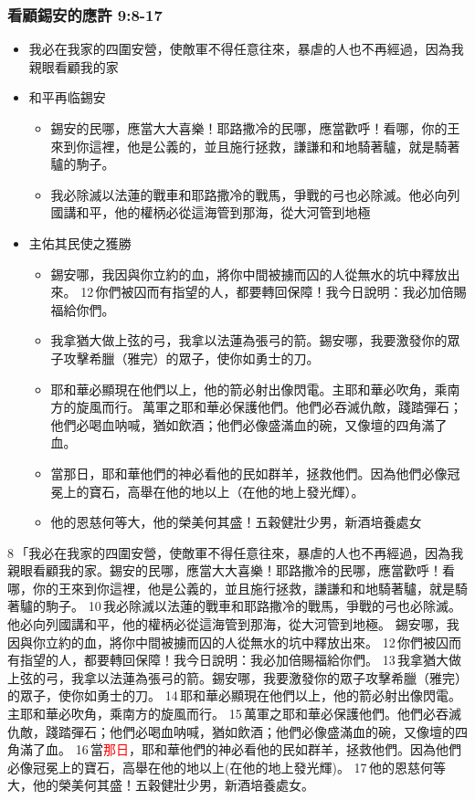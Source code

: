\subsubsection{看顧錫安的應許 9:8-17}
\begin{itemize} 
\itemsep-.5em 
\item 我必在我家的四圍安營，使敵軍不得任意往來，暴虐的人也不再經過，因為我親眼看顧我的家
\item 和平再临錫安
\begin{itemize} 
\itemsep-.5em 
\item 錫安的民哪，應當大大喜樂！耶路撒冷的民哪，應當歡呼！看哪，你的王來到你這裡，他是公義的，並且施行拯救，謙謙和和地騎著驢，就是騎著驢的駒子。
\item 我必除滅以法蓮的戰車和耶路撒冷的戰馬，爭戰的弓也必除滅。他必向列國講和平，他的權柄必從這海管到那海，從大河管到地極
\end{itemize}
\item 主佑其民使之獲勝
\begin{itemize} 
\itemsep-.5em 
\item 錫安哪，我因與你立約的血，將你中間被擄而囚的人從無水的坑中釋放出來。 12 你們被囚而有指望的人，都要轉回保障！我今日說明：我必加倍賜福給你們。
\item 我拿猶大做上弦的弓，我拿以法蓮為張弓的箭。錫安哪，我要激發你的眾子攻擊希臘（雅完）的眾子，使你如勇士的刀。
\item 耶和華必顯現在他們以上，他的箭必射出像閃電。主耶和華必吹角，乘南方的旋風而行。 萬軍之耶和華必保護他們。他們必吞滅仇敵，踐踏彈石；他們必喝血呐喊，猶如飲酒；他們必像盛滿血的碗，又像壇的四角滿了血。
\item 當那日，耶和華他們的神必看他的民如群羊，拯救他們。因為他們必像冠冕上的寶石，高舉在他的地以上（在他的地上發光輝）。 
\item 他的恩慈何等大，他的榮美何其盛！五穀健壯少男，新酒培養處女
\end{itemize}
\end{itemize}
8 「我必在我家的四圍安營，使敵軍不得任意往來，暴虐的人也不再經過，因為我親眼看顧我的家。錫安的民哪，應當大大喜樂！耶路撒冷的民哪，應當歡呼！看哪，你的王來到你這裡，他是公義的，並且施行拯救，謙謙和和地騎著驢，就是騎著驢的駒子。 10 我必除滅以法蓮的戰車和耶路撒冷的戰馬，爭戰的弓也必除滅。他必向列國講和平，他的權柄必從這海管到那海，從大河管到地極。
錫安哪，我因與你立約的血，將你中間被擄而囚的人從無水的坑中釋放出來。 12 你們被囚而有指望的人，都要轉回保障！我今日說明：我必加倍賜福給你們。 13 我拿猶大做上弦的弓，我拿以法蓮為張弓的箭。錫安哪，我要激發你的眾子攻擊希臘（雅完）的眾子，使你如勇士的刀。 14 耶和華必顯現在他們以上，他的箭必射出像閃電。主耶和華必吹角，乘南方的旋風而行。 15 萬軍之耶和華必保護他們。他們必吞滅仇敵，踐踏彈石；他們必喝血呐喊，猶如飲酒；他們必像盛滿血的碗，又像壇的四角滿了血。 16 當\textcolor{red}{那日}，耶和華他們的神必看他的民如群羊，拯救他們。因為他們必像冠冕上的寶石，高舉在他的地以上(在他的地上發光輝)。 17 他的恩慈何等大，他的榮美何其盛！五穀健壯少男，新酒培養處女。

